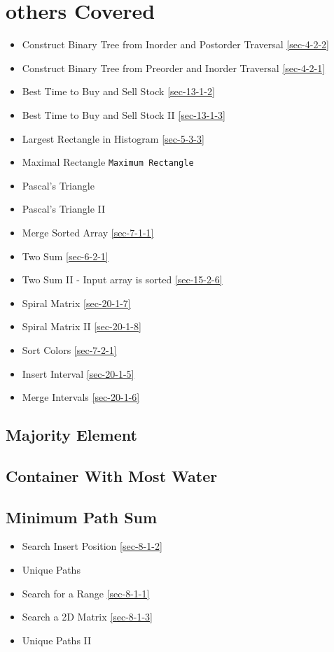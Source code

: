 \documentclass[12pt]{book}
\begin{document}
\section{others Covered}
\label{sec-1-4}
\begin{itemize}
\item Construct Binary Tree from Inorder and Postorder Traversal
\ref{sec-4-2-2}
\item Construct Binary Tree from Preorder and Inorder Traversal
\ref{sec-4-2-1}
\item Best Time to Buy and Sell Stock
\ref{sec-13-1-2}
\item Best Time to Buy and Sell Stock II        
\ref{sec-13-1-3}
\item Largest Rectangle in Histogram
\ref{sec-5-3-3}
\item Maximal Rectangle
\texttt{Maximum Rectangle}
\item Pascal's Triangle
\item Pascal's Triangle II
\item Merge Sorted Array        
\ref{sec-7-1-1}
\item Two Sum
\ref{sec-6-2-1}
\item Two Sum II - Input array is sorted
\ref{sec-15-2-6}
\item Spiral Matrix
\ref{sec-20-1-7}
\item Spiral Matrix II
\ref{sec-20-1-8}
\item Sort Colors
\ref{sec-7-2-1}
\item Insert Interval
\ref{sec-20-1-5}
\item Merge Intervals
\ref{sec-20-1-6}
\end{itemize}
\subsection{Majority Element}
\label{sec-1-4-1}
\subsection{Container With Most Water}
\label{sec-1-4-2}
\subsection{Minimum Path Sum}
\label{sec-1-4-3}
\begin{itemize}
\item Search Insert Position
\ref{sec-8-1-2}
\item Unique Paths
\item Search for a Range
\ref{sec-8-1-1}
\item Search a 2D Matrix
\ref{sec-8-1-3}
\item Unique Paths II
\end{itemize}
\end{document}
